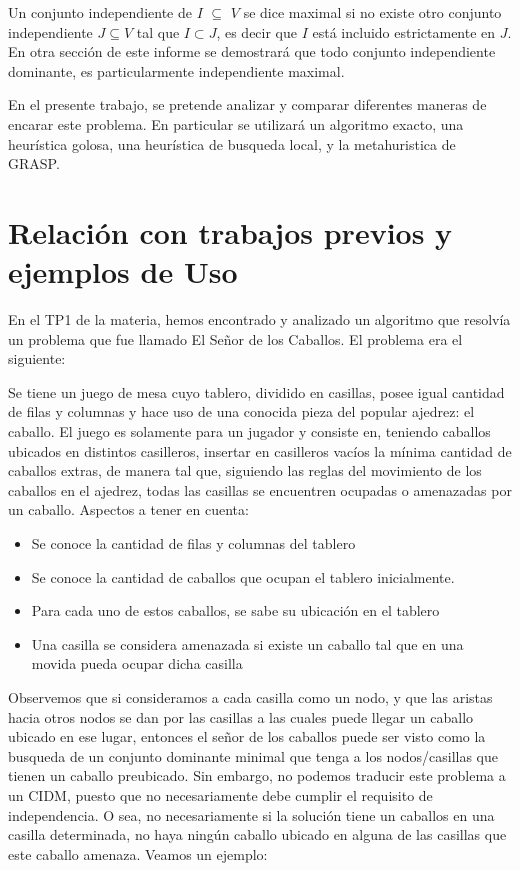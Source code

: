 \documentclass[a4paper]{article}
\begin{document}
Un conjunto independiente de $I$ $\subseteq$ $V$ se dice maximal si no existe otro conjunto independiente $J \subseteq V$ tal que $I \subset J$, es decir que $I$ está incluido estrictamente en $J$. En otra sección de este informe se demostrará que todo conjunto independiente dominante, es particularmente independiente maximal.

En el presente trabajo, se pretende analizar y comparar diferentes maneras de encarar este problema. En particular se utilizará un algoritmo exacto, una heurística golosa, una heurística de busqueda local, y la metahuristica de GRASP.

\section{Relación con trabajos previos y ejemplos de Uso}

En el TP1 de la materia, hemos encontrado y analizado un algoritmo que resolvía un problema que fue llamado El Señor de los Caballos. El problema era el siguiente:

Se tiene un juego de mesa cuyo tablero, dividido en casillas, posee igual cantidad de filas y columnas y hace uso de una conocida pieza del popular ajedrez: el caballo. El juego es solamente para un jugador y consiste en, teniendo caballos ubicados en distintos casilleros, insertar en casilleros vacíos la mínima cantidad de caballos extras, de manera tal que, siguiendo las reglas del movimiento de los caballos en el ajedrez, todas las casillas se encuentren ocupadas o amenazadas por un caballo.
Aspectos a tener en cuenta:

\begin{itemize}
   \item Se conoce la cantidad de filas y columnas del tablero
   \item Se conoce la cantidad de caballos que ocupan el tablero inicialmente.
   \item Para cada uno de estos caballos, se sabe su ubicación en el tablero
   \item Una casilla se considera amenazada si existe un caballo tal que en una movida pueda ocupar dicha casilla
\end{itemize}

Observemos que si consideramos a cada casilla como un nodo, y que las aristas hacia otros nodos se dan por las casillas a las cuales puede llegar un caballo ubicado en ese lugar, entonces el señor de los caballos puede ser visto como la busqueda de un conjunto dominante minimal que tenga a los nodos/casillas que tienen un caballo preubicado. Sin embargo, no podemos traducir este problema a un CIDM, puesto que no necesariamente debe cumplir el requisito de independencia. O sea, no necesariamente si la solución tiene un caballos en una casilla determinada, no haya ningún caballo ubicado en alguna de las casillas que este caballo amenaza. Veamos un ejemplo:
\end{document}
